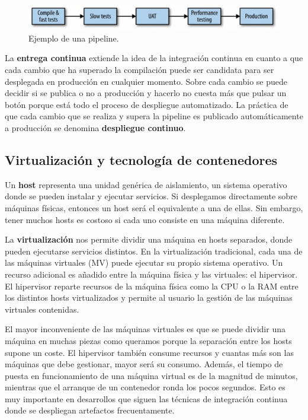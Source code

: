 \documentclass[11pt,spanish,listoffigures]{tfgetsinf}
\begin{document}
\begin{figure}[h]
\centering
\includegraphics[scale=1]{pipeline}
\caption{Ejemplo de una pipeline. \cite{Newman2015a}}
\end{figure}

La \textbf{entrega continua} extiende la idea de la integración continua en cuanto a que cada cambio que ha superado la compilación puede ser candidata para ser desplegada en producción en cualquier momento. Sobre cada cambio se puede decidir si se publica o no a producción y hacerlo no cuesta más que pulsar un botón porque está todo el proceso de despliegue automatizado. La práctica de que cada cambio que se realiza y supera la pipeline es publicado automáticamente a producción se denomina \textbf{despliegue continuo}. \cite{Fowler2013}

\subsection{Virtualización y tecnología de contenedores}

Un \textbf{host} representa una unidad genérica de aislamiento, un sistema operativo donde se pueden instalar y ejecutar servicios. Si desplegamos directamente sobre máquinas físicas, entonces un host será el equivalente a una de ellas. Sin embargo, tener muchos hosts es costoso si cada uno consiste en una máquina diferente. \cite{Newman2015a}

La \textbf{virtualización} nos permite dividir una máquina en hosts separados, donde pueden ejecutarse servicios distintos. En la virtualización tradicional, cada una de las máquinas virtuales (MV) puede ejecutar su propio sistema operativo. Un recurso adicional es añadido entre la máquina física y las virtuales: el hipervisor. El hipervisor reparte recursos de la máquina física como la CPU o la RAM entre los distintos hosts virtualizados y permite al usuario la gestión de las máquinas virtuales contenidas.

El mayor inconveniente de las máquinas virtuales es que se puede dividir una máquina en muchas piezas como queramos porque la separación entre los hosts supone un coste. El hipervisor también consume recursos y cuantas más son las máquinas que debe gestionar, mayor será su consumo. Además, el tiempo de puesta en funcionamiento de una máquina virtual es de la magnitud de minutos, mientras que el arranque de un contenedor ronda los pocos segundos. \cite{Dua2014} Esto es muy importante en desarrollos que siguen las técnicas de integración continua donde se despliegan artefactos frecuentamente. 
\end{document}

